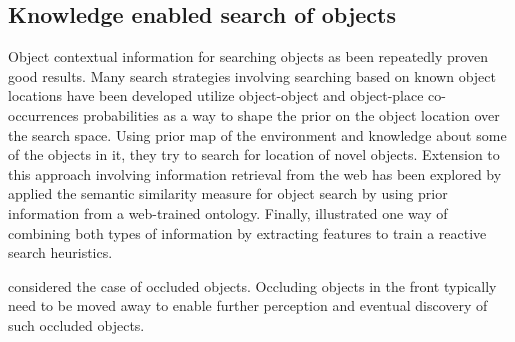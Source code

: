 \subsection{Knowledge enabled search of objects}
\label{sub:partially known objects}
Object contextual information for searching objects as been repeatedly proven good results. Many search strategies involving searching based on known object locations have been developed
\cite{kollar_utilizing_2009} utilize object-object and object-place co-occurrences probabilities as a way to shape the prior on the object location over the search space. Using prior map of the environment and knowledge about some of the objects in it, they try to search for location of novel objects.
Extension to this approach involving information retrieval from the web has been explored by \cite {samadi_using_2012}
\cite{kunze_searching_2012} applied the semantic similarity measure for object search by using prior information from a web-trained ontology.
Finally, \cite{joho_learning_2011} illustrated one way of combining both types of information by extracting features to train a reactive search heuristics.

\cite{wong_using_2014} considered the case of occluded objects. Occluding objects in the front typically need to be moved away to enable further perception and eventual discovery of such occluded objects. 


